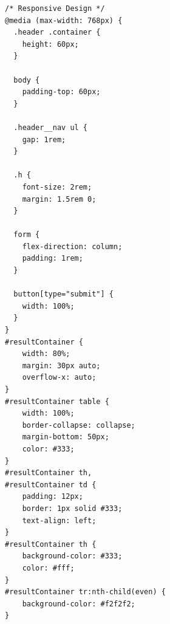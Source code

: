 \documentclass{report}
\begin{document}
\begin{verbatim}
/* Responsive Design */
@media (max-width: 768px) {
  .header .container {
    height: 60px;
  }
 
  body {
    padding-top: 60px;
  }
 
  .header__nav ul {
    gap: 1rem;
  }
 
  .h {
    font-size: 2rem;
    margin: 1.5rem 0;
  }
 
  form {
    flex-direction: column;
    padding: 1rem;
  }
 
  button[type="submit"] {
    width: 100%;
  }
}
#resultContainer {
    width: 80%;
    margin: 30px auto;
    overflow-x: auto;
}
#resultContainer table {
    width: 100%;
    border-collapse: collapse;
    margin-bottom: 50px;
    color: #333;
}
#resultContainer th,
#resultContainer td {
    padding: 12px;
    border: 1px solid #333;
    text-align: left;
}
#resultContainer th {
    background-color: #333;
    color: #fff;
}
#resultContainer tr:nth-child(even) {
    background-color: #f2f2f2;
}
\end{verbatim}
\end{document}
